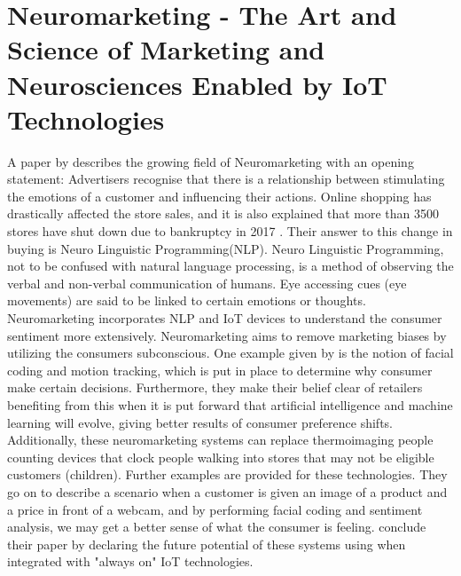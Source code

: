 \section{Neuromarketing - The Art and Science of Marketing and Neurosciences Enabled by IoT Technologies}
A paper by \citeauthor{arthmann} describes the growing field of Neuromarketing with an opening statement: Advertisers recognise that there is a relationship between stimulating the emotions of a customer and influencing their actions. Online shopping has drastically affected the store sales, and it is also explained that more than 3500 stores have shut down due to bankruptcy in 2017 \citep{arthmann}. Their answer to this change in buying is Neuro Linguistic Programming(NLP). Neuro Linguistic Programming, not to be confused with natural language processing, is a method of observing the verbal and non-verbal communication of humans. Eye accessing cues (eye movements) are said to be linked to certain emotions or thoughts. Neuromarketing incorporates NLP and IoT devices to understand the consumer sentiment more extensively. Neuromarketing aims to remove marketing biases by utilizing the consumers subconscious. One example given by \citeauthor{arthmann} is the notion of facial coding and motion tracking, which is put in place to determine why consumer make certain decisions. 
Furthermore, they make their belief clear of retailers benefiting from this when it is put forward that artificial intelligence and machine learning will evolve, giving better results of consumer preference shifts. Additionally, these neuromarketing systems can replace thermoimaging people counting devices that clock people walking into stores that may not be eligible customers (children). Further examples are provided for these technologies. They go on to describe a scenario when a customer is given an image of a product and a price in front of a webcam, and by performing facial coding and sentiment analysis, we may get a better sense of what the consumer is feeling.
\citeauthor{arthmann} conclude their paper by declaring the future potential of these systems using when integrated with "always on" IoT technologies. 

